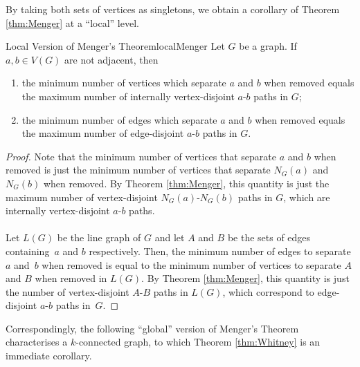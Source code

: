 \documentclass[math]{amznotes}
\theoremstyle{remark}
\begin{document}
By taking both sets of vertices as singletons, we obtain a corollary of Theorem \ref{thm:Menger} at a ``local'' level.
\begin{corbox}{Local Version of Menger's Theorem}{localMenger}
    Let $G$ be a graph. If $a, b \in V(G)$ are not adjacent, then 
    \begin{enumerate}
        \item the minimum number of vertices which separate $a$ and $b$ when removed equals the maximum number of internally vertex-disjoint $a$-$b$ paths in $G$;
        \item the minimum number of edges which separate $a$ and $b$ when removed equals the maximum number of edge-disjoint $a$-$b$ paths in $G$.
    \end{enumerate}
    \tcblower
    \begin{proof}
        Note that the minimum number of vertices that separate $a$ and $b$ when removed is just the minimum number of vertices that separate $N_G(a)$ and $N_G(b)$ when removed. By Theorem \ref{thm:Menger}, this quantity is just the maximum number of vertex-disjoint $N_G(a)$-$N_G(b)$ paths in $G$, which are internally vertex-disjoint $a$-$b$ paths.
        \\\\
        Let $L(G)$ be the line graph of $G$ and let $A$ and $B$ be the sets of edges containing~$a$ and $b$ respectively. Then, the minimum number of edges to separate $a$ and~$b$ when removed is equal to the minimum number of vertices to separate $A$ and $B$ when removed in $L(G)$. By Theorem \ref{thm:Menger}, this quantity is just the number of vertex-disjoint $A$-$B$ paths in $L(G)$, which correspond to edge-disjoint $a$-$b$ paths in~$G$.
    \end{proof}
\end{corbox}
Correspondingly, the following ``global'' version of Menger's Theorem characterises a $k$-connected graph, to which Theorem \ref{thm:Whitney} is an immediate corollary.
\end{document}
